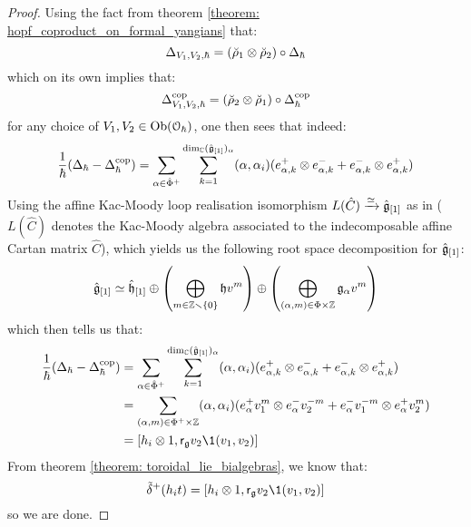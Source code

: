 \begin{proof}
                Using the fact from theorem \ref{theorem: hopf_coproduct_on_formal_yangians} that:
                    $$\Delta_{V_1, V_2, \hbar} = (\breve{\rho}_1 \tensor \breve{\rho}_2) \circ \Delta_{\hbar}$$
                which on its own implies that:
                    $$\Delta_{V_1, V_2, \hbar}^{\cop} = (\breve{\rho}_2 \tensor \breve{\rho}_1) \circ \Delta_{\hbar}^{\cop}$$
                for any choice of $V_1, V_2 \in \mathrm{Ob}(\mathcal{O}_{\hbar})$, one then sees that indeed:
                    $$\frac{1}{\hbar}( \Delta_{\hbar} - \Delta_{\hbar}^{\cop} ) = \sum_{\alpha \in \hat{\Phi}^+} \sum_{k = 1}^{ \dim_{\bbC} (\hat{\g}_{[1]})_{\alpha} } (\alpha, \alpha_i) ( e_{\alpha, k}^+ \tensor e_{\alpha, k}^- + e_{\alpha, k}^- \tensor e_{\alpha, k}^+ )$$
                Using the affine Kac-Moody loop realisation isomorphism $L(\hat{C}) \xrightarrow[]{\simeq} \hat{\mathfrak{g}}_{[1]}$ as in \cite[Chapter 7]{kac_infinite_dimensional_lie_algebras} ($L(\hat{C})$ denotes the Kac-Moody algebra associated to the indecomposable affine Cartan matrix $\hat{C}$), which yields us the following root space decomposition for $\hat{\mathfrak{g}}_{[1]}$:
                    $$\hat{\g}_{[1]} \cong \hat{\h}_{[1]} \oplus \left( \bigoplus_{m \in \Z \setminus \{0\}} \h v^m \right) \oplus \left( \bigoplus_{(\alpha, m) \in \Phi \x \Z} \g_{\alpha} v^m \right)$$
                which then tells us that:
                    $$
                        \begin{aligned}
                            \frac{1}{\hbar}( \Delta_{\hbar} - \Delta_{\hbar}^{\cop} ) & = \sum_{\alpha \in \hat{\Phi}^+} \sum_{k = 1}^{ \dim_{\bbC} (\hat{\g}_{[1]})_{\alpha} } (\alpha, \alpha_i) ( e_{\alpha, k}^+ \tensor e_{\alpha, k}^- + e_{\alpha, k}^- \tensor e_{\alpha, k}^+ )
                            \\
                            & = \sum_{(\alpha, m) \in \Phi^+ \x \Z} (\alpha, \alpha_i) ( e_{\alpha}^+ v_1^m \tensor e_{\alpha}^- v_2^{-m} + e_{\alpha}^- v_1^{-m} \tensor e_{\alpha}^+ v_2^m )
                            \\
                            & = [h_i \tensor 1, \sfr_{\g} v_2 \1(v_1, v_2)]
                        \end{aligned}
                    $$
                From theorem \ref{theorem: toroidal_lie_bialgebras}, we know that:
                    $$\tilde{\delta}^+(h_i t) = [h_i \tensor 1, \sfr_{\g} v_2 \1(v_1, v_2)]$$
                so we are done.
            \end{proof}